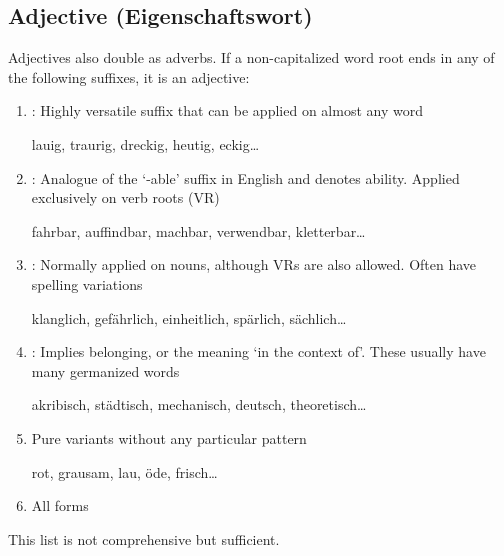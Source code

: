 \subsection[Adjective]{Adjective (Eigenschaftswort)}
Adjectives  also double as adverbs. If a non-capitalized word root  ends in any of the following suffixes,  it is an adjective:
\begin{enumerate}
    \item {}: Highly versatile suffix that can be applied on almost any word \begin{example}
        lauig, traurig, dreckig, heutig, eckig\ldots
    \end{example}
    \item {}: Analogue of the `-able' suffix in English and denotes ability. Applied exclusively on verb roots (VR)\begin{example}
        fahrbar, auffindbar, machbar, verwendbar, kletterbar\ldots
    \end{example}
    \item {}: Normally applied on nouns, although  VRs are also allowed. Often have spelling variations\begin{example}
        klanglich, gefährlich, einheitlich, spärlich, sächlich\ldots
    \end{example}
    \item {}: Implies belonging, or the meaning  `in the context of'. These  usually have many germanized words\begin{example}
        akribisch, städtisch, mechanisch, deutsch, theoretisch\ldots
    \end{example}
    \item Pure variants without any particular pattern\begin{example}
        rot, grausam, lau, öde, frisch\ldots
    \end{example}
    \item All  forms
\end{enumerate}
This list is not comprehensive but sufficient.

